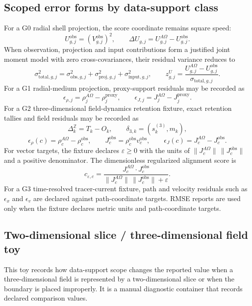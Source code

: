 \subsection{Scoped error forms by data-support class}\label{manual:field-dynamics-scoped-error-forms}
For a G0 radial shell projection, the score coordinate remains square speed:
\[
U^{\mathrm{obs}}_{g,j}=(V^{\mathrm{obs}}_{g,j})^2,
\qquad
\Delta U_{g,j}=U^{A\Omega}_{g,j}-U^{\mathrm{obs}}_{g,j}.
\]
When observation, projection and input contributions form a justified joint
moment model with zero cross-covariances, their residual variance reduces to
\[
\sigma^2_{\mathrm{total},g,j}
=
\sigma^2_{\mathrm{obs},g,j}
+
\sigma^2_{\mathrm{proj},g,j}
+
\sigma^2_{\mathrm{input},g,j},
\qquad
z^U_{g,j}=\frac{U^{A\Omega}_{g,j}-U^{\mathrm{obs}}_{g,j}}{\sigma_{\mathrm{total},g,j}}.
\]
For a G1 radial-medium projection, proxy-support residuals may be recorded as
\[
\epsilon_{\rho,j}=\rho^{A\Omega}_j-\rho^{\mathrm{proxy}}_j,
\qquad
\epsilon_{J,j}=J^{A\Omega}_j-J^{\mathrm{proxy}}_j.
\]
For a G2 three-dimensional field-dynamics retention fixture, exact retention tallies and field residuals may be recorded as
\[
\Delta^{\mathbb Z}_k=T_k-O_k,
\qquad
\delta_{3,k}=(s^{(3)}_k,m_k),
\]
\[
\epsilon_\rho(c)=\rho^{A\Omega}_c-\rho^{\mathrm{obs}}_c,
\qquad
J^{\mathrm{obs}}_c=\rho^{\mathrm{obs}}_c v^{\mathrm{obs}}_c,
\qquad
\epsilon_J(c)=J^{A\Omega}_c-J^{\mathrm{obs}}_c.
\]
For vector targets, the fixture declares \(\varepsilon\ge0\) with the units of \(\|J^{A\Omega}_c\|\,\|J^{\mathrm{obs}}_c\|\) and a positive denominator. The dimensionless regularized alignment score is
\[
c_{\varepsilon,c}=\frac{J^{A\Omega}_c\cdot J^{\mathrm{obs}}_c}{\|J^{A\Omega}_c\|\,\|J^{\mathrm{obs}}_c\|+\varepsilon}.
\]
For a G3 time-resolved tracer-current fixture, path and velocity residuals such as \(\epsilon_x\) and \(\epsilon_v\) are declared against path-coordinate targets. RMSE reports are used only when the fixture declares metric units and path-coordinate targets.
\subsection{Two-dimensional slice / three-dimensional field toy}\label{manual:2d-3d-slice-toy}
This toy records how data-support scope changes the reported value when a three-dimensional field is represented by a two-dimensional slice or when the boundary is placed improperly. It is a manual diagnostic container that records declared comparison values.

